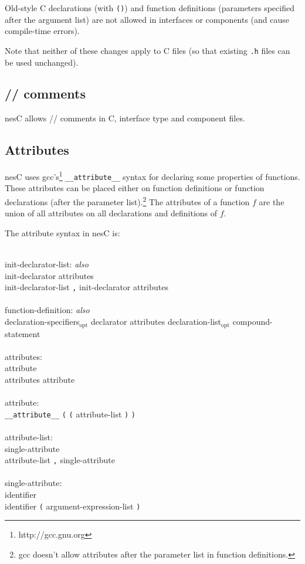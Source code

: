 \documentclass[11pt]{article}
\newcommand{\kw}[1]{{\tt #1}}
\newcommand{\code}[1]{{\tt #1}}
\newcommand{\file}[1]{{\tt #1}}
\newcommand{\nesc}{nesC\xspace}
\newcommand{\opt}{$_{\mbox{opt}}$\xspace}
\begin{document}
Old-style C declarations (with \code{()}) and function definitions 
(parameters specified after the argument list) are not allowed in
interfaces or components (and cause compile-time errors).

Note that neither of these changes apply to C files (so that existing
\file{.h} files can be used unchanged).

\subsection{// comments}

\nesc allows // comments in C, interface type and component files.

\subsection{Attributes}
\label{sec:attributes}

\nesc uses gcc's\footnote{http://gcc.gnu.org} \kw{\_\_attribute\_\_} syntax
for declaring some properties of functions. These attributes can be placed
either on function definitions or function declarations (after the
parameter list).\footnote{gcc doesn't allow attributes after the parameter
list in function definitions.} The attributes of a function $f$ are the
union of all attributes on all declarations and definitions of $f$.

The attribute syntax in \nesc is:
\em \begin{tabbing}
\hspace*{2cm}\= \\ \kill
init-declarator-list: \emph{also}\\
\>	init-declarator attributes\\
\>	init-declarator-list \kw{,} init-declarator attributes\\
\\
function-definition: \emph{also}\\
\>	declaration-specifiers\opt declarator attributes declaration-list\opt compound-statement\\
\\
attributes:\\
\>	attribute\\
\>	attributes attribute\\
\\
attribute:\\
\>	\kw{\_\_attribute\_\_} \kw{(} \kw{(} attribute-list \kw{)} \kw{)}\\
\\
attribute-list:\\
\>	single-attribute\\
\>	attribute-list \kw{,} single-attribute\\
\\
single-attribute:\\
\>	identifier\\
\>	identifier \kw{(} argument-expression-list \kw{)}\\
\end{tabbing} \rm
\end{document}
